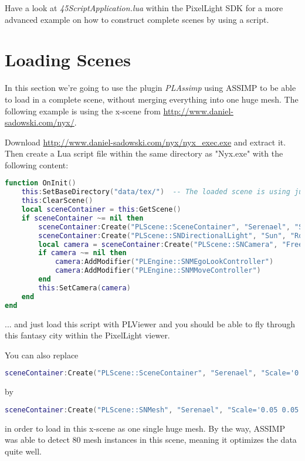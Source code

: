 Have a look at \emph{45ScriptApplication.lua} within the PixelLight \ac{SDK} for a more advanced example on how to construct complete scenes by using a script.




\section{Loading Scenes}
In this section we're going to use the plugin \emph{PLAssimp} using \ac{ASSIMP} to be able to load in a complete scene, without merging everything into one huge mesh. The following example is using the x-scene from \url{http://www.daniel-sadowski.com/nyx/}.

Download \url{http://www.daniel-sadowski.com/nyx/nyx_exec.exe} and extract it. Then create a Lua script file within the same directory as "Nyx.exe" with the following content:
\begin{lstlisting}[language=lua]
function OnInit()
	this:SetBaseDirectory("data/tex/")	-- The loaded scene is using just texture names like "Houses"
	this:ClearScene()
	local sceneContainer = this:GetScene()
	if sceneContainer ~= nil then
		sceneContainer:Create("PLScene::SceneContainer", "Serenael", "Scale='0.05 0.05 0.05' Filename='data/msh/serenael.x'")
		sceneContainer:Create("PLScene::SNDirectionalLight", "Sun", "Rotation='45 0 0'")
		local camera = sceneContainer:Create("PLScene::SNCamera", "FreeCamera")
		if camera ~= nil then
			camera:AddModifier("PLEngine::SNMEgoLookController")
			camera:AddModifier("PLEngine::SNMMoveController")
		end
		this:SetCamera(camera)
	end
end
\end{lstlisting}
... and just load this script with PLViewer and you should be able to fly through this fantasy city within the PixelLight viewer.

You can also replace
\begin{lstlisting}[language=lua]
sceneContainer:Create("PLScene::SceneContainer", "Serenael", "Scale='0.05 0.05 0.05' Filename='data/msh/serenael.x'")
\end{lstlisting}
by
\begin{lstlisting}[language=lua]
sceneContainer:Create("PLScene::SNMesh", "Serenael", "Scale='0.05 0.05 0.05' Mesh='data/msh/serenael.x'")
\end{lstlisting}
in order to load in this x-scene as one single huge mesh. By the way, \ac{ASSIMP} was able to detect 80 mesh instances in this scene, meaning it optimizes the data quite well.

